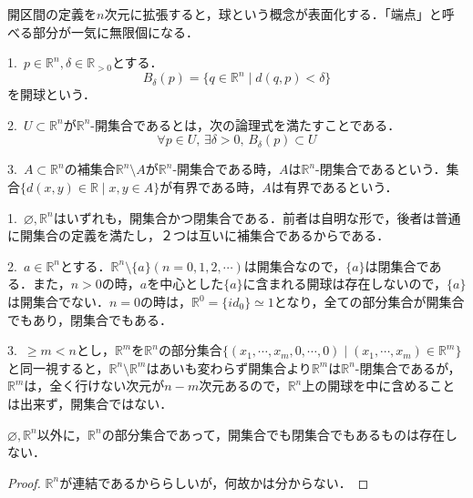 \documentclass[uplatex, 12pt, dvipdfmx]{jsreport}
\begin{document}
開区間の定義を$n$次元に拡張すると，球という概念が表面化する．「端点」と呼べる部分が一気に無限個になる．
\begin{definition}[開集合]\rm{}

    1.\, $p\in\mathbb{R}^n, \delta\in\mathbb{R}_{>0}$とする．
    $$B_\delta (p)=\{ q\in\mathbb{R}^n \mid d(q,p)<\delta \} $$
    を開球という．
    
    2.\, $U\subset\mathbb{R}^n$が$\mathbb{R}^n$-開集合であるとは，次の論理式を満たすことである．
    $$\forall p\in U,\, \exists\delta >0,\, B_\delta (p)\subset U$$

    3.\, $A\subset\mathbb{R}^n$の補集合$\mathbb{R}^n\setminus A$が$\mathbb{R}^n$-開集合である時，$A$は$\mathbb{R}^n$-閉集合であるという．集合$\{d(x,y)\in\mathbb{R}\mid x,y\in A\}$が有界である時，$A$は有界であるという．
\end{definition}

\begin{example}\rm{}

    1.\, $\varnothing,\mathbb{R}^n$はいずれも，開集合かつ閉集合である．前者は自明な形で，後者は普通に開集合の定義を満たし，２つは互いに補集合であるからである．

    2.\, $a\in\mathbb{R}^n$とする．$\mathbb{R}^n\setminus \{a\}(n=0,1,2,\cdots)$は開集合なので，$\{a\}$は閉集合である．また，$n>0$の時，$a$を中心とした$\{a\}$に含まれる開球は存在しないので，$\{a\}$は開集合でない．$n=0$の時は，$\mathbb{R}^0=\{id_0\}\simeq 1$となり，全ての部分集合が開集合でもあり，閉集合でもある．

    3.\, $\ge m<n$とし，$\mathbb{R}^m$を$\mathbb{R}^n$の部分集合$\{(x_1,\cdots,x_m,0,\cdots,0)\mid (x_1,\cdots,x_m)\in\mathbb{R}^m\}$と同一視すると，$\mathbb{R}^n\setminus\mathbb{R}^m$はあいも変わらず開集合より$\mathbb{R}^m$は$\mathbb{R}^n$-閉集合であるが，$\mathbb{R}^m$は，全く行けない次元が$n-m$次元あるので，$\mathbb{R}^n$上の開球を中に含めることは出来ず，開集合ではない．
\end{example}

\begin{proposition}
    $\varnothing,\mathbb{R}^n$以外に，$\mathbb{R}^n$の部分集合であって，開集合でも閉集合でもあるものは存在しない．
\end{proposition}
\begin{proof}
    $\mathbb{R}^n$が連結であるかららしいが，何故かは分からない．
\end{proof}
\end{document}

